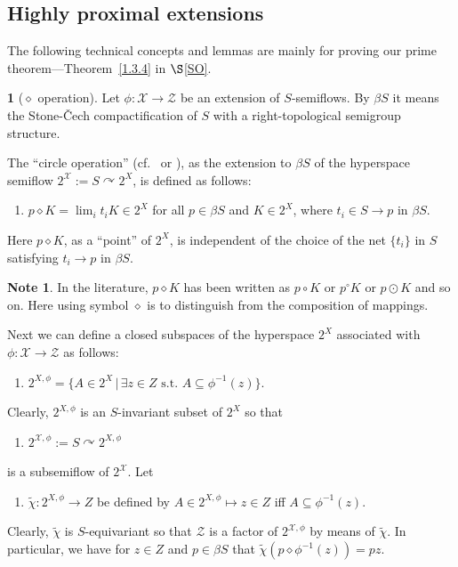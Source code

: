 \documentclass[12pt,final,3p,times]{elsarticle}
\theoremstyle{definition}
\newtheorem{sse}[sthm]{}
\newtheorem*{xnote}{Note}
\numberwithin{equation}{section}
\begin{document}
\subsection{Highly proximal extensions}\label{sP.3}%
The following technical concepts and lemmas are mainly for proving our prime theorem---Theorem~\ref{1.3.4} in $\S$\ref{SO}. 

\begin{sse}[$\diamond$ operation]\label{P2.3.1}
Let $\phi\colon\mathscr{X}\rightarrow\mathscr{Z}$ be an extension of $S$-semiflows. By $\beta S$ it means the Stone-\v{C}ech compactification of $S$ with a right-topological semigroup structure.

 The ``circle operation'' (cf.~\cite{G76, Wo, A88, DeV} or \cite[A.1.1]{CD}), as the extension to $\beta S$ of the hyperspace semiflow $2^\mathscr{X}:=S\curvearrowright2^X$, is defined as follows:
\begin{enumerate}
\item[] $p\diamond K=\lim_i t_iK\in 2^X$ for all $p\in\beta S$ and $K\in2^X$, where $t_i\in S\to p$ in $\beta S$.
\end{enumerate}
Here $p\diamond K$, as a ``point'' of $2^X$, is independent of the choice of the net $\{t_i\}$ in $S$ satisfying $t_i\to p$ in $\beta S$. 
\begin{xnote}
  In the literature, $p\diamond K$ has been written as $p\circ K$ or $p^\circ K$ or $p\odot K$ and so on. Here using symbol $\diamond$ is to distinguish from the composition of mappings.  
\end{xnote}

Next we can define a closed subspaces of the hyperspace $2^X$ associated with $\phi\colon\mathscr{X}\rightarrow\mathscr{Z}$ as follows:
\begin{enumerate}
\item[] $2^{X,\phi}=\{A\in 2^X\,|\,\exists z\in Z\textrm{ s.t. }A\subseteq\phi^{-1}(z)\}$.
\end{enumerate}
Clearly, $2^{X,\phi}$ is an $S$-invariant subset of $2^X$ so that
\begin{enumerate}
\item[] $2^{\mathscr{X},\phi}:=S\curvearrowright 2^{X,\phi}$
\end{enumerate}
is a subsemiflow of $2^\mathscr{X}$. Let
\begin{enumerate}
\item[] $\tilde{\chi}\colon 2^{X,\phi}\rightarrow Z$ be defined by $A\in2^{X,\phi}\mapsto z\in Z$ iff $A\subseteq\phi^{-1}(z)$.
\end{enumerate}
Clearly, $\tilde{\chi}$ is $S$-equivariant so that $\mathscr{Z}$ is a factor of $2^{\mathscr{X},\phi}$ by means of $\tilde{\chi}$. In particular, we have for $z\in Z$ and $p\in \beta S$ that $\tilde{\chi}(p\diamond\phi^{-1}(z))=pz$.
\end{sse}
\end{document}
